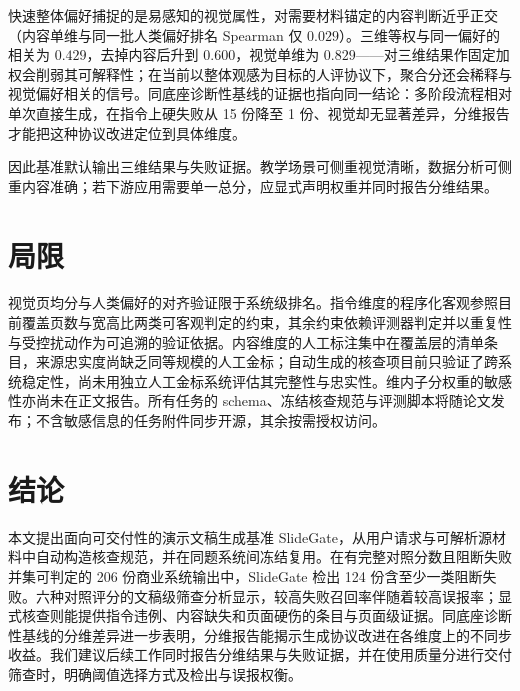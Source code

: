 快速整体偏好捕捉的是易感知的视觉属性，对需要材料锚定的内容判断近乎正交（内容单维与同一批人类偏好排名 Spearman 仅 \(0.029\)）。三维等权与同一偏好的相关为 \(0.429\)，去掉内容后升到 \(0.600\)，视觉单维为 \(0.829\)------对三维结果作固定加权会削弱其可解释性；在当前以整体观感为目标的人评协议下，聚合分还会稀释与视觉偏好相关的信号。同底座诊断性基线的证据也指向同一结论：多阶段流程相对单次直接生成，在指令上硬失败从 15 份降至 1 份、视觉却无显著差异，分维报告才能把这种协议改进定位到具体维度。

因此基准默认输出三维结果与失败证据。教学场景可侧重视觉清晰，数据分析可侧重内容准确；若下游应用需要单一总分，应显式声明权重并同时报告分维结果。

\section{局限}\label{ux5c40ux9650}

视觉页均分与人类偏好的对齐验证限于系统级排名。指令维度的程序化客观参照目前覆盖页数与宽高比两类可客观判定的约束，其余约束依赖评测器判定并以重复性与受控扰动作为可追溯的验证依据。内容维度的人工标注集中在覆盖层的清单条目，来源忠实度尚缺乏同等规模的人工金标；自动生成的核查项目前只验证了跨系统稳定性，尚未用独立人工金标系统评估其完整性与忠实性。维内子分权重的敏感性亦尚未在正文报告。所有任务的 schema、冻结核查规范与评测脚本将随论文发布；不含敏感信息的任务附件同步开源，其余按需授权访问。

\section{结论}\label{ux7ed3ux8bba}

本文提出面向可交付性的演示文稿生成基准 SlideGate，从用户请求与可解析源材料中自动构造核查规范，并在同题系统间冻结复用。在有完整对照分数且阻断失败并集可判定的 206 份商业系统输出中，SlideGate 检出 124 份含至少一类阻断失败。六种对照评分的文稿级筛查分析显示，较高失败召回率伴随着较高误报率；显式核查则能提供指令违例、内容缺失和页面硬伤的条目与页面级证据。同底座诊断性基线的分维差异进一步表明，分维报告能揭示生成协议改进在各维度上的不同步收益。我们建议后续工作同时报告分维结果与失败证据，并在使用质量分进行交付筛查时，明确阈值选择方式及检出与误报权衡。
